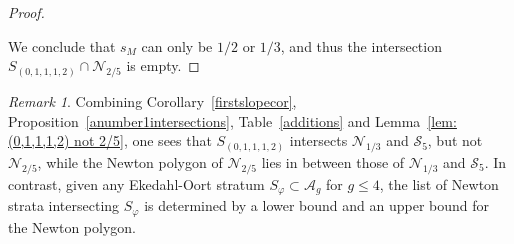 \documentclass[11pt,table]{amsart}
\numberwithin{equation}{section}
\theoremstyle{definition}
\theoremstyle{remark}
\theoremstyle{remark}
\newtheorem{remark}[equation]{Remark}
\begin{document}
\begin{proof}
\begin{enumerate}

\end{enumerate}
We conclude that $s_M$ can only be $1/2$ or $1/3$, and thus the intersection $S_{(0,1,1,1,2)} \cap \mathcal{N}_{2/5}$ is empty.


\end{proof}

\begin{remark} \label{rmk: Newton sandwich}
Combining Corollary~\ref{firstslopecor}, Proposition~\ref{anumber1intersections}, Table~\ref{additions} and Lemma~\ref{lem: (0,1,1,1,2) not 2/5}, one sees that $S_{(0,1,1,1,2)}$ intersects $\mathcal{N}_{1/3}$ and $\mathcal{S}_5$, but not $\mathcal{N}_{2/5}$, while the Newton polygon of $\mathcal{N}_{2/5}$ lies in between those of $\mathcal{N}_{1/3}$ and $\mathcal{S}_5$. In contrast, given any Ekedahl-Oort stratum $S_\varphi \subset \mathcal{A}_g$ for $g\leq 4$, the list of Newton strata intersecting $S_\varphi$ is determined by a lower bound and an upper bound for the Newton polygon. 
\end{remark}
\end{document}
